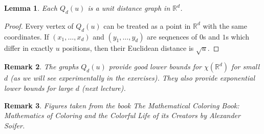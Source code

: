 \documentclass[a4paper]{article}
\theoremstyle{plain}
\newtheorem{lemma}{Lemma}
\theoremstyle{myremark}
\newtheorem{remark}[lemma]{Remark}
\newcommand{\RR}{\mathbb{R}}
\begin{document}
\begin{lemma}
Each $Q_d(u)$ is a unit distance graph in $\RR^d$.
\end{lemma}
\begin{proof}
Every vertex of $Q_d(u)$ can be treated as a point in $\RR^d$ with the same coordinates. If $(x_1,\ldots,x_d)$ and $(y_1,\ldots,y_d)$ are seqnences of $0$s and $1$s which differ in exactly $u$ positions, then their Euclidean distance is $\sqrt{u}$. 
\end{proof}

\begin{remark}
The graphs $Q_d(u)$ provide good lower bounds for $\chi(\RR^d)$ for small $d$ (as we will see experimentally in the exercises). They also provide exponential lower bounds for large $d$ (next lecture).
\end{remark}

\begin{remark}
Figures taken from the book \emph{The Mathematical Coloring Book: Mathematics of Coloring and the Colorful Life of its Creators} by Alexander Soifer.	
\end{remark}
\end{document}

